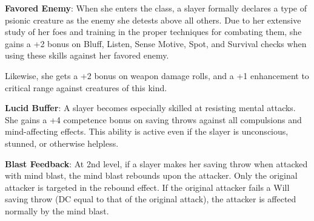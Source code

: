 \textbf{Favored Enemy}: When she enters the class, a slayer formally declares a type of psionic creature as the enemy she detests above all others. Due to her extensive study of her foes and training in the proper techniques for combating them, she gains a +2 bonus on Bluff, Listen, Sense Motive, Spot, and Survival checks when using these skills against her favored enemy.

Likewise, she gets a +2 bonus on weapon damage rolls, and a +1 enhancement to critical range against creatures of this kind.

\textbf{Lucid Buffer}: A slayer becomes especially skilled at resisting mental attacks. She gains a +4 competence bonus on saving throws against all compulsions and mind-affecting effects. This ability is active even if the slayer is unconscious, stunned, or otherwise helpless.

\textbf{Blast Feedback}: At 2nd level, if a slayer makes her saving throw when attacked with mind blast, the mind blast rebounds upon the attacker. Only the original attacker is targeted in the rebound effect. If the original attacker fails a Will saving throw (DC equal to that of the original attack), the attacker is affected normally by the mind blast.
